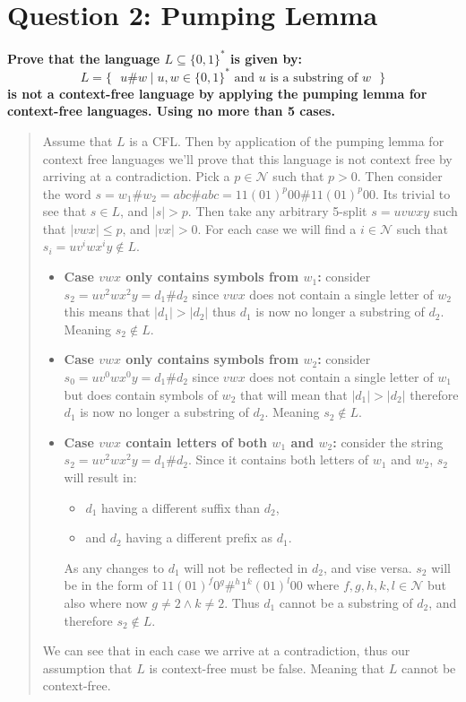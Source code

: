 \section*{Question 2: Pumping Lemma}
    \textbf{Prove that the language $L \subseteq \{0,1\}^\ast$ is given by:}
    \begin{displaymath} %
        L = \{\text{ }
            u\#w  \mid u, w \in \{0, 1\}^* \text{ and } u \text{ is a substring of } w
        \text{ }\}
    \end{displaymath}
    \textbf{is not a context-free language by applying the pumping lemma for context-free languages. Using no more than 5 cases.}
    \medskip
    \begin{quote}
        Assume that $L$ is a CFL. Then by application of the pumping lemma for context free languages we'll prove that this language is not context free by arriving at a contradiction. Pick a $p\in\mathcal{N}$ such that $p > 0$. Then consider the word $s = w_1\#w_2 = abc\#abc = 11(01)^p00\#11(01)^p00$. Its trivial to see that $s\in L$, and $|s| > p$. Then take any arbitrary 5-split $s = uvwxy$ such that $|vwx| \leqslant p$, and $|vx| > 0$. For each case we will find a $i\in \mathcal{N}$ such that $s_i = uv^iwx^iy \not\in L$.
        \begin{itemize}
            \item \textbf{Case $vwx$ only contains symbols from $w_1$:} consider $s_2 = uv^2wx^2y = d_1\#d_2$ since $vwx$ does not contain a single letter of $w_2$ this means that $|d_1| > |d_2|$ thus $d_1$ is now no longer a substring of $d_2$. Meaning $s_2 \not\in L$.
            \item \textbf{Case $vwx$ only contains symbols from $w_2$:} consider $s_0 = uv^0wx^0y = d_1\#d_2$ since $vwx$ does not contain a single letter of $w_1$ but does contain symbols of $w_2$ that will mean that $|d_1| > |d_2|$ therefore $d_1$ is now no longer a substring of $d_2$. Meaning $s_2 \not\in L$.
            \item \textbf{Case $vwx$ contain letters of both $w_1$ and $w_2$:} consider the string $s_2 = uv^2wx^2y = d_1\#d_2$. Since it contains both letters of $w_1$ and $w_2$, $s_2$ will result in:
            \begin{itemize}
                \item $d_1$ having a different suffix than $d_2$,
                \item and $d_2$ having a different prefix as $d_1$.
            \end{itemize}
            As any changes to $d_1$ will not be reflected in $d_2$, and vise versa. $s_2$ will be in the form of $11(01)^f0^g\#^h1^k(01)^l00$ where $f, g, h, k, l \in\mathcal{N}$ but also where now $g\neq 2 \wedge k\neq2$. Thus $d_1$ cannot be a substring of $d_2$, and therefore $s_2\not\in L$.
        \end{itemize}
        We can see that in each case we arrive at a contradiction, thus our assumption that $L$ is context-free must be false. Meaning that $L$ cannot be context-free.
    \end{quote}
